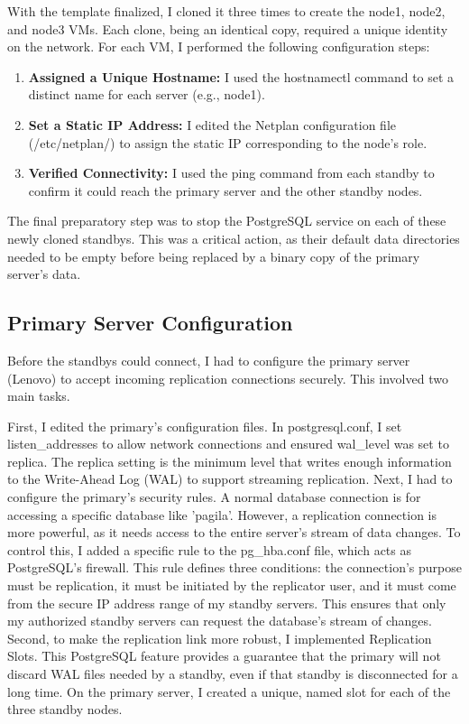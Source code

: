 \documentclass[conference]{IEEEtran}
\begin{document}
With the template finalized, I cloned it three times to create the node1, node2, and node3 VMs. Each clone, being an identical copy, required a unique identity on the network. For each VM, I performed the following configuration steps:

\begin{enumerate}

\item \textbf{Assigned a Unique Hostname:} I used the hostnamectl command to set a distinct name for each server (e.g., node1).

\item \textbf{Set a Static IP Address:} I edited the Netplan configuration file (/etc/netplan/) to assign the static IP corresponding to the node's role.

\item \textbf{Verified Connectivity:} I used the ping command from each standby to confirm it could reach the primary server and the other standby nodes.

\end{enumerate}

The final preparatory step was to stop the PostgreSQL service on each of these newly cloned standbys. This was a critical action, as their default data directories needed to be empty before being replaced by a binary copy of the primary server's data.

\subsection{Primary Server Configuration}

Before the standbys could connect, I had to configure the primary server (Lenovo) to accept incoming replication connections securely. This involved two main tasks.

First, I edited the primary's configuration files. In postgresql.conf, I set listen\_addresses to allow network connections and ensured wal\_level was set to replica. The replica setting is the minimum level that writes enough information to the Write-Ahead Log (WAL) to support streaming replication. Next, I had to configure the primary's security rules. A normal database connection is for accessing a specific database like 'pagila'. However, a replication connection is more powerful, as it needs access to the entire server's stream of data changes. To control this, I added a specific rule to the pg\_hba.conf file, which acts as PostgreSQL's firewall. This rule defines three conditions: the connection's purpose must be replication, it must be initiated by the replicator user, and it must come from the secure IP address range of my standby servers. This ensures that only my authorized standby servers can request the database's stream of changes.
Second, to make the replication link more robust, I implemented Replication Slots. This PostgreSQL feature provides a guarantee that the primary will not discard WAL files needed by a standby, even if that standby is disconnected for a long time. On the primary server, I created a unique, named slot for each of the three standby nodes.
\end{document}
